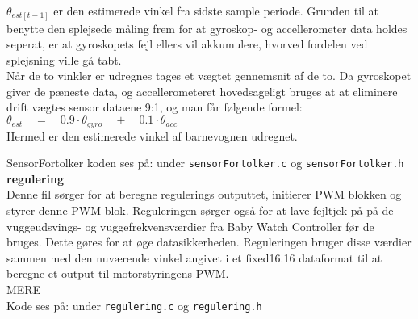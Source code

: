 ${ \theta  }_{ est\left[ t-1 \right]  }$ er den estimerede vinkel fra sidste sample periode. Grunden til at benytte den splejsede måling frem for at gyroskop- og accellerometer data holdes seperat, er at gyroskopets fejl ellers vil akkumulere, hvorved fordelen ved splejsning ville gå tabt.\\
Når de to vinkler er udregnes tages et vægtet gennemsnit af de to. Da gyroskopet giver de pæneste data, og accellerometeret hovedsageligt bruges at at eliminere drift vægtes sensor dataene 9:1, og man får følgende formel:\\
	${ \theta  }_{ est }\quad =\quad 0.9\cdot { \theta  }_{ gyro }\quad +\quad 0.1\cdot { \theta  }_{ acc }$ \\
Hermed er den estimerede vinkel af barnevognen udregnet.

SensorFortolker koden ses på: \citep{cd} under \verb+sensorFortolker.c+ og \verb+sensorFortolker.h+\\

\textbf{regulering} \\
Denne fil sørger for at beregne regulerings outputtet, initierer PWM blokken og styrer denne PWM blok. Reguleringen sørger også for at lave fejltjek på på de vuggeudsvings- og vuggefrekvensværdier fra Baby Watch Controller før de bruges. Dette gøres for at øge datasikkerheden. Reguleringen bruger disse værdier sammen med den nuværende vinkel angivet i et fixed16.16 dataformat til at beregne et output til motorstyringens PWM. 
\\ MERE \\
Kode ses på: \citep{cd} under \verb+regulering.c+ og \verb+regulering.h+\\
